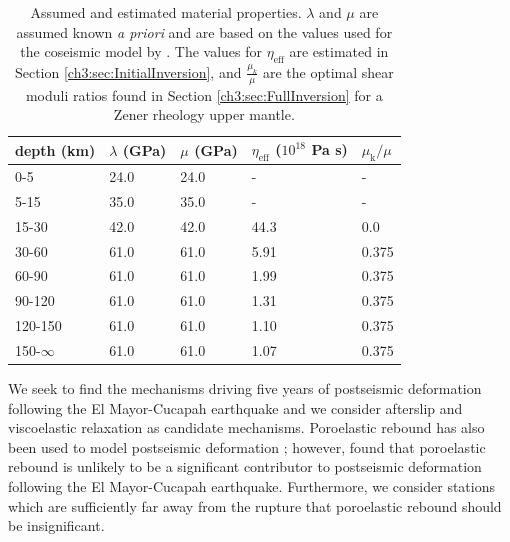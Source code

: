 \begin{table}\label{ch3:tab:MaterialProperties}
\begin{tabular} {l l l l l}
depth (km) &$\lambda$ (GPa)&$\mu$ (GPa)&$\eta_\mathrm{eff}$ ($10^{18}$ Pa s) & $\mu_\mathrm{k}/\mu$\\ \hline
0-5 & 24.0 & 24.0 & - & -\\
5-15 & 35.0 & 35.0 & - & -\\
15-30 & 42.0 & 42.0 & 44.3 & 0.0\\
30-60 & 61.0 & 61.0 & 5.91 & 0.375\\
60-90 & 61.0 & 61.0 & 1.99 & 0.375\\
90-120 & 61.0 & 61.0 & 1.31 & 0.375\\
120-150 & 61.0 & 61.0 & 1.10 & 0.375\\
150-$\infty$ & 61.0 & 61.0 & 1.07 & 0.375\\
\end{tabular}
\caption{Assumed and estimated material properties. $\lambda$ and $\mu$ are assumed known \textit{a priori} and are based on the values used for the coseismic model by \citet{Wei2011}.  The values for $\eta_\mathrm{eff}$ are estimated in Section \ref{ch3:sec:InitialInversion}, and $\frac{\mu_k}{\mu}$ are the optimal shear moduli ratios found in Section \ref{ch3:sec:FullInversion} for a Zener rheology upper mantle.} 
\end{table}

We seek to find the mechanisms driving five years of postseismic deformation following the El Mayor-Cucapah earthquake and we consider afterslip and viscoelastic relaxation as candidate mechanisms.  Poroelastic rebound has also been used to model postseismic deformation \citep[e.g.][]{Jonsson2003}; however, \citet{Gonzalez-ortega2014} found that poroelastic rebound is unlikely to be a significant contributor to postseismic deformation following the El Mayor-Cucapah earthquake. Furthermore, we consider stations which are sufficiently far away from the rupture that poroelastic rebound should be insignificant.  

